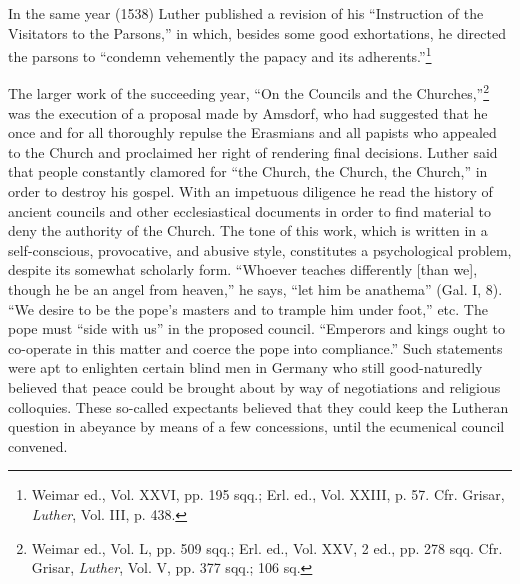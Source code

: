 In the same year (1538) Luther published a revision of his “Instruction
of the Visitators to the Parsons,” in which, besides some good
exhortations, he directed the parsons to “condemn vehemently the
papacy and its adherents.”\footnote
{Weimar ed., Vol. XXVI, pp. 195 sqq.; Erl. ed., Vol. XXIII, p. 57. Cfr. Grisar, \textit{Luther},
Vol. III, p. 438.}

The larger work of the succeeding year, “On the Councils and the
Churches,”\footnote
{Weimar ed., Vol. L, pp. 509 sqq.; Erl. ed., Vol. XXV, 2 ed., pp. 278 sqq. Cfr. Grisar,
\textit{Luther}, Vol. V, pp. 377 sqq.; 106 sq.}
was the execution of a proposal made by Amsdorf, who
had suggested that he once and for all thoroughly repulse the Erasmians
and all papists who appealed to the Church and proclaimed
her right of rendering final decisions. Luther said that people constantly
clamored for “the Church, the Church, the Church,” in order
to destroy his gospel. With an impetuous diligence he read the history
of ancient councils and other ecclesiastical documents in order to find
material to deny the authority of the Church. The tone of this work,
which is written in a self-conscious, provocative, and abusive style,
constitutes a psychological problem, despite its somewhat scholarly
form. “Whoever teaches differently [than we], though he be an
angel from heaven,” he says, “let him be anathema” (Gal. I, 8). “We
desire to be the pope’s masters and to trample him under foot,” etc.
The pope must “side with us” in the proposed council. “Emperors and
kings ought to co-operate in this matter and coerce the pope into
compliance.” Such statements were apt to enlighten certain blind
men in Germany who still good-naturedly believed that peace could
be brought about by way of negotiations and religious colloquies.
These so-called expectants believed that they could keep the Lutheran
question in abeyance by means of a few concessions, until the ecumenical
council convened.

